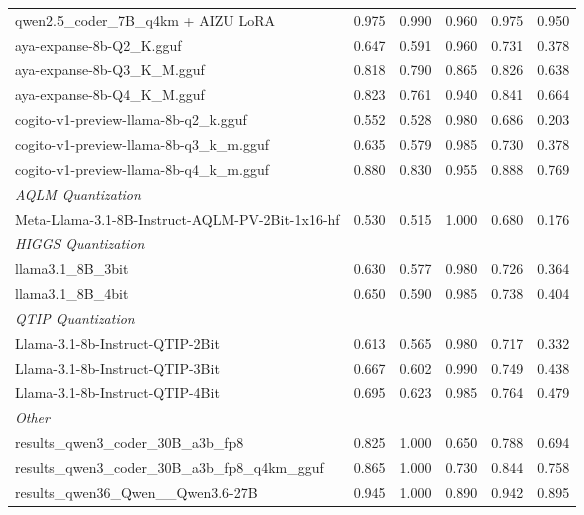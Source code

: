 \begin{table}[htbp]
{\begin{tabular}{lrrrrr}
    qwen2.5\_coder\_7B\_q4km + AIZU LoRA & 0.975 & 0.990 & 0.960 & 0.975 & \cellcolor{green!20}0.950 \\
    aya-expanse-8b-Q2\_K.gguf & 0.647 & 0.591 & 0.960 & 0.731 & 0.378 \\
    aya-expanse-8b-Q3\_K\_M.gguf & 0.818 & 0.790 & 0.865 & 0.826 & 0.638 \\
    aya-expanse-8b-Q4\_K\_M.gguf & 0.823 & 0.761 & 0.940 & 0.841 & 0.664 \\
    cogito-v1-preview-llama-8b-q2\_k.gguf & 0.552 & 0.528 & 0.980 & 0.686 & 0.203 \\
    cogito-v1-preview-llama-8b-q3\_k\_m.gguf & 0.635 & 0.579 & 0.985 & 0.730 & 0.378 \\
    cogito-v1-preview-llama-8b-q4\_k\_m.gguf & 0.880 & 0.830 & 0.955 & 0.888 & 0.769 \\
    \midrule
    \multicolumn{6}{l}{\textit{AQLM Quantization}} \\
    \midrule
    Meta-Llama-3.1-8B-Instruct-AQLM-PV-2Bit-1x16-hf & 0.530 & 0.515 & 1.000 & 0.680 & 0.176 \\
    \midrule
    \multicolumn{6}{l}{\textit{HIGGS Quantization}} \\
    \midrule
    llama3.1\_8B\_3bit & 0.630 & 0.577 & 0.980 & 0.726 & 0.364 \\
    llama3.1\_8B\_4bit & 0.650 & 0.590 & 0.985 & 0.738 & 0.404 \\
    \midrule
    \multicolumn{6}{l}{\textit{QTIP Quantization}} \\
    \midrule
    Llama-3.1-8b-Instruct-QTIP-2Bit & 0.613 & 0.565 & 0.980 & 0.717 & 0.332 \\
    Llama-3.1-8b-Instruct-QTIP-3Bit & 0.667 & 0.602 & 0.990 & 0.749 & 0.438 \\
    Llama-3.1-8b-Instruct-QTIP-4Bit & 0.695 & 0.623 & 0.985 & 0.764 & 0.479 \\
    \midrule
    \multicolumn{6}{l}{\textit{Other}} \\
    \midrule
    results\_qwen3\_coder\_30B\_a3b\_fp8 & 0.825 & 1.000 & 0.650 & 0.788 & 0.694 \\
    results\_qwen3\_coder\_30B\_a3b\_fp8\_q4km\_gguf & 0.865 & 1.000 & 0.730 & 0.844 & 0.758 \\
    results\_qwen36\_Qwen\_\_Qwen3.6-27B & 0.945 & 1.000 & 0.890 & 0.942 & 0.895 \\
    \bottomrule
  \end{tabular}
  }
\end{table}


